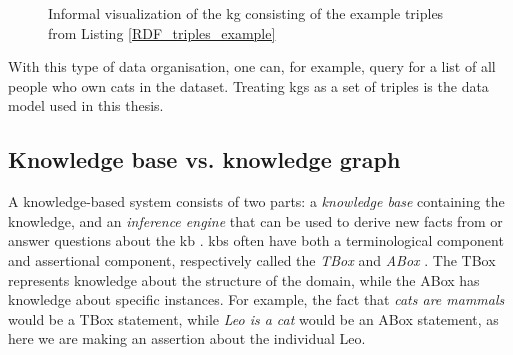 \begin{figure}[htbp]
\centering
{}

\caption[Visualization of RDF triple example in listing \ref{RDF_triples_example}]{Informal visualization of the \gls{kg} consisting of the example triples from Listing \ref{RDF_triples_example}} \label{fig:KG_example_2}
\end{figure}

With this type of data organisation, one can, for example, query for a list of all people who own cats in the dataset. Treating \glspl{kg} as a set of triples is the data model used in this thesis.


\subsection{Knowledge base vs. knowledge graph}
A knowledge-based system consists of two parts: a \textit{knowledge base} containing the knowledge, and an \textit{inference engine} that can be used to derive new facts from or answer questions about the \gls{kb} \cite{akerkar2009knowledge}. \glspl{kb} often have both a terminological component and assertional component, respectively called the \textit{TBox} and \textit{ABox} \cite{brachman1989overview}. The TBox represents knowledge about the structure of the domain, while the ABox has knowledge about specific instances. For example, the fact that \emph{cats are  mammals} would be a TBox statement, while \emph{Leo is a cat} would be an ABox statement, as here we are making an assertion about the individual Leo.

